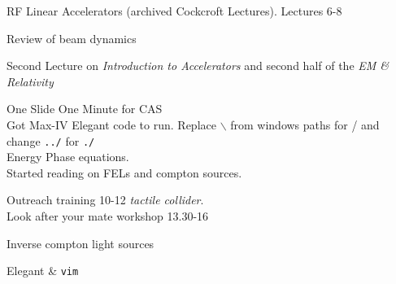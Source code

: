 
RF Linear Accelerators (archived Cockcroft Lectures). Lectures 6-8\\



Review of beam dynamics



Second Lecture on \textit{Introduction to Accelerators} and second half of the \textit{EM \& Relativity}



One Slide One Minute for CAS\\
Got Max-IV Elegant code to run. Replace $\backslash$ from windows paths for / and change \verb|../| for \verb|./|\\ 
Energy Phase equations.\\
Started reading on FELs and compton sources.


Outreach training 10-12 \textit{tactile collider}.\\
Look after your mate workshop 13.30-16\\


Inverse compton light sources


Elegant \& \verb|vim|

